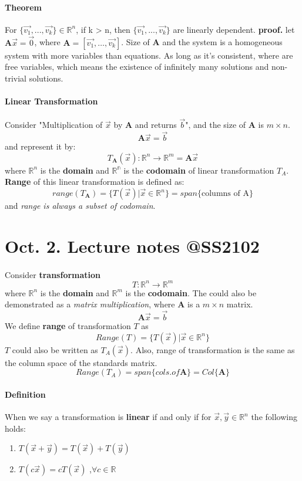 \documentclass{article}
\begin{document}
	\paragraph{Theorem} For $\{\vec{v_1},...,\vec{v_k}\} \in \mathbb{R}^n$, if k > n, then $\{\vec{v_1},...,\vec{v_k}\}$ are linearly dependent.
	\newline \textbf{proof.} let $\textbf{A}\vec{x}=\vec{0}$, where $\textbf{A} = [\vec{v_1},\dots,\vec{v_k}]$. Size of \textbf{A} and the system is a homogeneous system with more variables than equations. As long as it's consistent, where are free variables, which means the existence of infinitely many solutions and non-trivial solutions.
	\paragraph{Linear Transformation} Consider "Multiplication of $\vec{x}$ by \textbf{A} and returns $\vec{b}$", and the size of \textbf{A} is $m\times n$.
	\[
	\textbf{A}\vec{x} = \vec{b}
	\]
	and represent it by:
	\[
	T_\textbf{A}(\vec{x}): \mathbb{R}^n \rightarrow \mathbb{R}^m = \textbf{A}\vec{x}
	\]
	where $\mathbb{R}^n$ is the \textbf{domain} and $\mathbb{R^n}$ is the \textbf{codomain} of linear transformation $T_A$. \textbf{Range} of this linear transformation is defined as: 
	\[
	range(T_\textbf{A}) = \{T(\vec{x}) \vert \vec{x} \in \mathbb{R}^n \} = span\{\text{columns of A}\}
	\]
	and \emph{range is always a subset of codomain}.
	\newpage
	\section{Oct. 2. Lecture notes @SS2102}
	\paragraph{}Consider \textbf{transformation}
	\[
	T:\mathbb{R}^n \rightarrow \mathbb{R}^m 
	\]
	where $\mathbb{R}^n$ is the \textbf{domain} and $\mathbb{R}^m$ is the \textbf{codomain}. The could also be demonstrated as a \emph{matrix multiplication}, where \textbf{A} is a $m \times n$ matrix.
	\[
	\textbf{A}\vec{x} = \vec{b}
	\]
	We define \textbf{range} of transformation $T$ as 
	\[
	Range(T) = \{T(\vec{x})\vert \vec{x} \in \mathbb{R}^n \}
	\]
	$T$ could also be written as $T_A(\vec{x})$. Also, range of transformation is the same as the column space of the standards matrix.
	\[
	Range(T_A) = span\{cols. of \textbf{A}\} = Col\{\textbf{A}\}
	\]
	\paragraph{Definition} When we say a transformation is \textbf{linear} if and only if for $\vec{x},\vec{y} \in \mathbb{R}^n$ the following holds:
	\begin{enumerate}[label=\roman*. ]
		\item $T(\vec{x}+\vec{y}) = T(\vec{x}) + T(\vec{y})$
		\item $T(c\vec{x}) = cT(\vec{x})$ ,\quad $\forall c \in \mathbb{R}$
	\end{enumerate}
\end{document}

